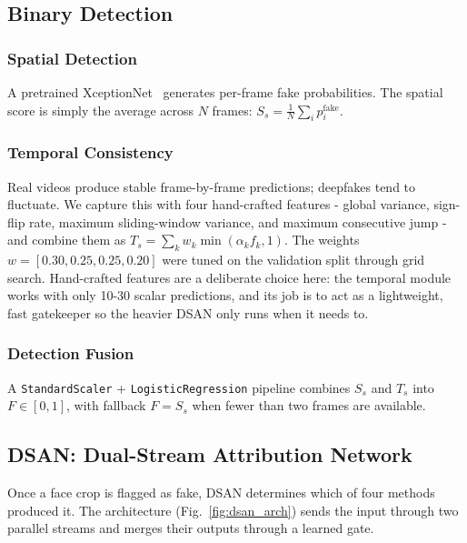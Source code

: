\subsection{Binary Detection}

\subsubsection{Spatial Detection}
A pretrained XceptionNet~\cite{rossler2019faceforensics} generates per-frame fake probabilities. The spatial score is simply the average across $N$ frames: $S_s = \frac{1}{N}\sum_{i} p_i^{\text{fake}}$.

\subsubsection{Temporal Consistency}
Real videos produce stable frame-by-frame predictions; deepfakes tend to fluctuate. We capture this with four hand-crafted features - global variance, sign-flip rate, maximum sliding-window variance, and maximum consecutive jump - and combine them as $T_s = \sum_{k} w_k \min(\alpha_k f_k, 1)$. The weights $w = [0.30, 0.25, 0.25, 0.20]$ were tuned on the validation split through grid search. Hand-crafted features are a deliberate choice here: the temporal module works with only 10-30 scalar predictions, and its job is to act as a lightweight, fast gatekeeper so the heavier DSAN only runs when it needs to.

\subsubsection{Detection Fusion}
A \texttt{StandardScaler} + \texttt{LogisticRegression} pipeline combines $S_s$ and $T_s$ into $F \in [0,1]$, with fallback $F = S_s$ when fewer than two frames are available.

\subsection{DSAN: Dual-Stream Attribution Network}

Once a face crop is flagged as fake, DSAN determines which of four methods produced it. The architecture (Fig.~\ref{fig:dsan_arch}) sends the input through two parallel streams and merges their outputs through a learned gate.

